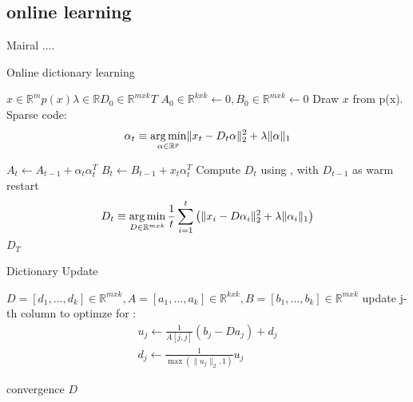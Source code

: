 \subsection{online learning}
\label{sec:mairal}
Mairal .... \cite{Mairal2010}

\begin{algorithm}
\caption{Online dictionary learning \cite{Mairal2010}}
\begin{algorithmic}[1]
\REQUIRE $x \in \mathbb{R}^m  p \left( x \right) \lambda \in \mathbb{R} D_0 \in \mathbb{R}^{mxk} T$
\STATE $A_0 \in \mathbb{R}^{kxk} \gets  0, B_0 \in \mathbb{R}^{mxk}\gets 0$
\STATE Draw $x$ from p(x).
\STATE Sparse code:
\begin{align} 
\alpha_t \equiv \operatorname*{arg\,min}_{\alpha\in\mathbb{R}^{p}}  \lVert x_t - D_t\alpha \rVert^{2}_{2}  +  \lambda \lVert \alpha \rVert_{1}
\end{align}

\STATE $A_t \gets A_{t-1} + \alpha_t\alpha_t^T$
\STATE $B_t \gets B_{t-1} + x_t\alpha_t^T$
\STATE Compute $D_t$ using , with $D_{t-1}$ as warm restart 
\begin{align} 
D_t \equiv \operatorname*{arg\,min}_{D \in \mathbb{R}^{m x k}}  \frac{1}{t} \sum_{i=1}^t \left( \lVert x_i - D\alpha_i \rVert^{2}_{2}  +  \lambda \lVert \alpha_i \rVert_{1} \right) \label{eq:update}
\end{align}
\ENDFOR
\RETURN $D_T$
\end{algorithmic}
\end{algorithm}


\begin{algorithm}
\caption{Dictionary Update}
\label{alg:update}
\begin{algorithmic}[1]
\REQUIRE $D=[d_1,...,d_k] \in \mathbb{R}^{mxk}, A=[a_1,...,a_k] \in \mathbb{R}^{kxk}, B=[b_1,...,b_k] \in \mathbb{R}^{mxk}$
\REPEAT
{}
\STATE update j-th column to optimze for :
\begin{align}
u_j \gets \frac{1}{A[j,j]}\left(b_j-Da_j\right)+d_j \\
d_j \gets \frac{1}{\max\left(\lVert u_j \rVert_2,1\right)} u_j
\end{align}

\ENDFOR
\UNTIL convergence 
\RETURN $D$
\end{algorithmic}
\end{algorithm}

